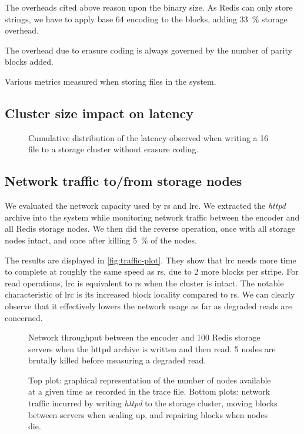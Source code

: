 The overheads cited above reason upon the binary size.
As Redis can only store strings, we have to apply base 64 encoding to the blocks, adding \SI{33}{\percent} storage overhead.

The overhead due to erasure coding is always governed by the number of parity blocks added.

\begin{table*}
    \centering
    \caption{Various metrics measured when storing files in the system.}
    
    \label{fig:overhead-table}
\end{table*}

\subsection{Cluster size impact on latency}
\label{subsec:latency}

\begin{figure}
    \centering
    
    \caption{Cumulative distribution of the latency observed when writing a \SI{16}{\mebi\byte} file to a storage cluster without erasure coding.}
    \label{fig:latency-plot}
\end{figure}

\subsection{Network traffic to/from storage nodes}
\label{subsec:network-traffic}

We evaluated the network capacity used by \ac{rs} and \ac{lrc}.
We extracted the \textit{httpd} archive into the system while monitoring network traffic between the encoder and all Redis storage nodes.
We then did the reverse operation, once with all storage nodes intact, and once after killing \SI{5}{\percent} of the nodes.

The results are displayed in \autoref{fig:traffic-plot}.
They show that \ac{lrc} needs more time to complete at roughly the same speed as \ac{rs}, due to 2 more blocks per stripe.
For read operations, \ac{lrc} is equivalent to \ac{rs} when the cluster is intact.
The notable characteristic of \ac{lrc} is its increased block locality compared to \ac{rs}.
We can clearly observe that it effectively lowers the network usage as far as degraded reads are concerned.

\begin{figure*}
    \centering
    
    \caption{Network throughput between the encoder and 100 Redis storage servers when the httpd archive is written and then read. 5 nodes are brutally killed before measuring a degraded read.}
    \label{fig:traffic-plot}
\end{figure*}

\begin{figure*}
    \centering
    
    \caption{Top plot: graphical representation of the number of nodes available at a given time as recorded in the trace file. Bottom plots: network traffic incurred by writing \textit{httpd} to the storage cluster, moving blocks between servers when scaling up, and repairing blocks when nodes die.}
    \label{fig:trace-plot}
\end{figure*}
